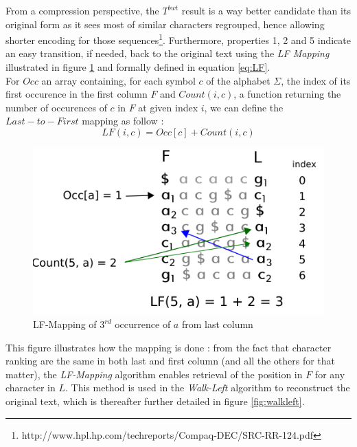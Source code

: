 From a compression perspective, the $T^{bwt}$ result is a way better candidate than its original form as it sees most of similar characters regrouped, hence allowing shorter encoding for those sequences\footnote{http://www.hpl.hp.com/techreports/Compaq-DEC/SRC-RR-124.pdf}. Furthermore, properties 1, 2 and 5 indicate an easy transition, if needed, back to the original text  using the  \textsl{LF Mapping} illustrated in figure \ref{fig:LF} and formally defined in equation \ref{eq:LF}. \\
\newpage
For $Occ$ an array containing, for each symbol $c$ of the alphabet $\Sigma$, the index of its first occurence in the first column $F$ and $Count(i, c)$, a function returning the number of occurences of $c$ in $F$ at given index $i$, we can define the $Last-to-First$ mapping as follow :
\begin{equation}
    LF(i, c) = Occ[c] + Count(i, c)
    \label{eq:LF}
\end{equation}


\begin{minipage}[t]{0.5\textwidth}
    \begin{figure}[H]
\hspace{-15mm}  \includegraphics[scale = 0.5]{Figures/LF.png}
  \caption{LF-Mapping of $3^{rd}$ occurrence of $a$ from last column}
    \label{fig:LF}
\end{figure}
\end{minipage}
\begin{minipage}[t]{0.4\textwidth}
        This figure illustrates how the mapping is done : from the fact that character ranking are the same in both last and first column (and all the others for that matter), the \textsl{LF-Mapping} algorithm enables retrieval of the position in $F$ for any character in $L$. This method is used in the \textsl{Walk-Left} algorithm to reconstruct the original text, which is thereafter further detailed in figure \ref{fig:walkleft}.
\end{minipage}
\vspace*{5mm}

